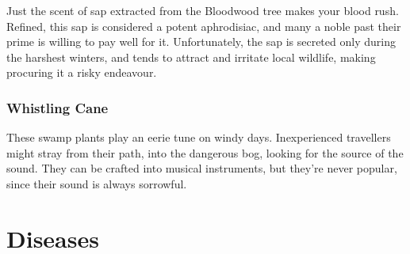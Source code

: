 \begin{multicols}{2}
Just the scent of sap extracted from the Bloodwood tree makes your blood rush. Refined, this sap is considered a potent aphrodisiac, 
and many a noble past their prime is willing to pay well for it. Unfortunately, the sap is secreted only during the harshest winters, 
and tends to attract and irritate local wildlife, making procuring it a risky endeavour.

\subsubsection{Whistling Cane}
\label{whistlingCane}

These swamp plants play an eerie tune on windy days. Inexperienced travellers might stray from their path, into the dangerous bog, 
looking for the source of the sound. They can be crafted into musical instruments, but they're never popular, since their sound is 
always sorrowful.

\end{multicols}

\section{Diseases}

